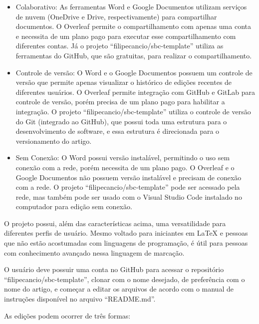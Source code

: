 \begin{itemize}
	\item Colaborativo: As ferramentas Word e Google Documentos utilizam serviços de nuvem (OneDrive e Drive, respectivamente) para compartilhar documentos. O Overleaf permite o compartilhamento com apenas uma conta e necessita de um plano pago para executar esse compartilhamento com diferentes contas. Já o projeto ``filipecancio/sbc-template'' utiliza as ferramentas do GitHub, que são gratuitas, para realizar o compartilhamento.
	\item Controle de versão: O Word e o Google Documentos possuem um controle de versão que permite apenas visualizar o histórico de edições recentes de diferentes usuários. O Overleaf permite integração com GitHub e GitLab para controle de versão, porém precisa de um plano pago para habilitar a integração. O projeto ``filipecancio/sbc-template'' utiliza o controle de versão do Git (integrado ao GitHub), que possui toda uma estrutura para o desenvolvimento de software, e essa estrutura é direcionada para o versionamento do artigo.
	\item Sem Conexão: O Word possui versão instalável, permitindo o uso sem conexão com a rede, porém necessita de um plano pago. O Overleaf e o Google Documentos não possuem versão instalável e precisam de conexão com a rede. O projeto ``filipecancio/sbc-template'' pode ser acessado pela rede, mas também pode ser usado com o Visual Studio Code instalado no computador para edição sem conexão.
\end{itemize}

O projeto possui, além das características acima, uma versatilidade para diferentes perfis de usuário. Mesmo voltado para iniciantes em LaTeX e pessoas que não estão acostumadas com linguagens de programação, é útil para pessoas com conhecimento avançado nessa linguagem de marcação.

O usuário deve possuir uma conta no GitHub para acessar o repositório ``filipecancio/sbc-template'', clonar com o nome desejado, de preferência com o nome do artigo, e começar a editar os arquivos de acordo com o manual de instruções disponível no arquivo ``README.md''.

As edições podem ocorrer de três formas:


